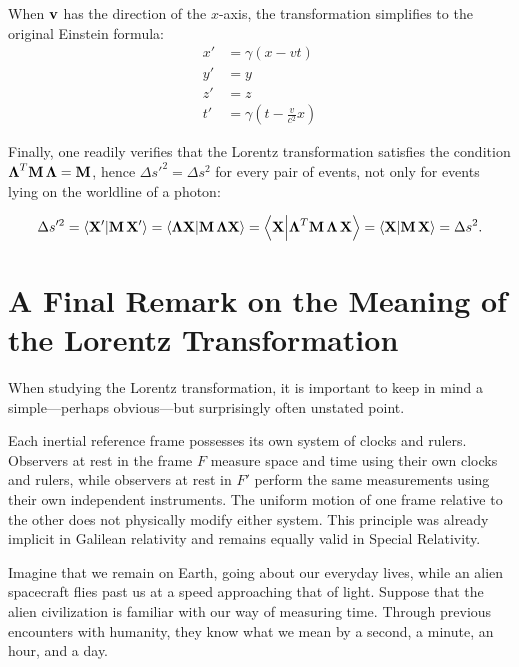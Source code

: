 \documentclass[12pt]{article}
\begin{document}
When $\vb{v}$ has the direction of the $x$-axis, the transformation simplifies to the original
Einstein formula:
\begin{align}
  x' &= \gamma(x - vt)               \nonumber \\
  y' &= y                            \nonumber \\
  z' &= z                            \nonumber \\
  t' &= \gamma\!\left(t - \frac{v}{c^2}x\right)
  \label{eq:Lorentz_1d}
\end{align}

Finally, one readily verifies that the Lorentz transformation satisfies the condition
$\boldsymbol{\Lambda}^T\vb{M}\,\boldsymbol{\Lambda} = \vb{M}$, hence $\Delta s'^2=\Delta s^2$ for every pair of events, not only for
events lying on the worldline of a photon:

\begin{equation}
  \Delta s'^2
  = \ip{\vb{X}'}{\vb{M}\,\vb{X}'}
  = \ip{\boldsymbol{\Lambda}\vb{X}}
        {\vb{M}\,\boldsymbol{\Lambda}\vb{X}}
  = \ip{\vb{X}}
        {\boldsymbol{\Lambda}^T\vb{M}\,
         \boldsymbol{\Lambda}\,\vb{X}}
  = \ip{\vb{X}}{\vb{M}\,\vb{X}}
  = \Delta s^2.
  \label{eq:spacetime_interval_invariance}
\end{equation}

\section{A Final Remark on the Meaning of the Lorentz Transformation}

When studying the Lorentz transformation, it is important to keep in mind a simple—perhaps 
obvious—but surprisingly often unstated point.\par

Each inertial reference frame possesses its own system of clocks and rulers.
Observers at rest in the frame $F$ measure space and time using their own clocks
and rulers, while observers at rest in $F'$ perform the same measurements using
their own independent instruments. The uniform motion of one frame relative to
the other does not physically modify either system. This principle was already
implicit in Galilean relativity and remains equally valid in Special Relativity.\par

Imagine that we remain on Earth, going about our everyday lives, while an alien
spacecraft flies past us at a speed approaching that of light. Suppose that the
alien civilization is familiar with our way of measuring time. Through previous
encounters with humanity, they know what we mean by a second, a minute, an
hour, and a day.\par
\end{document}
